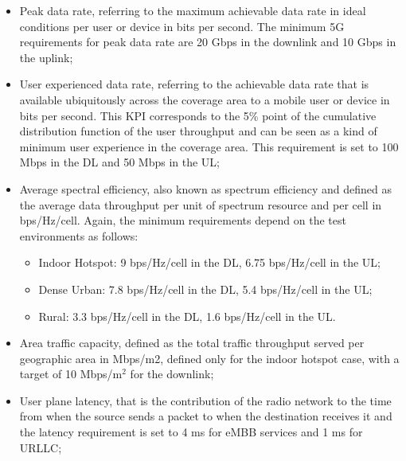 \documentclass[a4paper,12pt]{report} %
\begin{document}
\begin{itemize}
\item Peak data rate, referring to the maximum achievable data rate in ideal conditions per user or
device in bits per second. The minimum 5G requirements for peak data rate are 20 Gbps in the
downlink and 10 Gbps in the uplink;
\end{itemize}
\begin{itemize}
\item User experienced data rate, referring to the achievable data rate that is available ubiquitously
across the coverage area to a mobile user or device in bits per second. This KPI corresponds to the
5\% point of the cumulative distribution function of the user throughput and can be seen as
a kind of minimum user experience in the coverage area. This requirement is set to
100 Mbps in the DL and 50 Mbps in the UL;
\end{itemize}
\begin{itemize}
\item Average spectral efficiency, also known as spectrum efficiency and defined as the average data
throughput per unit of spectrum resource and per cell in bps/Hz/cell. Again, the minimum requirements depend on the test environments as follows:
\begin{itemize}
\item Indoor Hotspot: 9 bps/Hz/cell in the DL, 6.75 bps/Hz/cell in the UL;
\end{itemize}
\begin{itemize}
\item Dense Urban: 7.8 bps/Hz/cell in the DL, 5.4 bps/Hz/cell in the UL;
\end{itemize}
\begin{itemize}
\item Rural: 3.3 bps/Hz/cell in the DL, 1.6 bps/Hz/cell in the UL.
\end{itemize}
\end{itemize}
\begin{itemize}
\item Area traffic capacity, defined as the total traffic throughput served per geographic area in Mbps/m2, defined only for the indoor hotspot case, with a target of 10 Mbps/m$^2$ for
the downlink;
\end{itemize}
\begin{itemize}
\item User plane latency, that is the contribution of the radio network to the time from when the
source sends a packet to when the destination receives it and the latency
requirement is set to 4 ms for eMBB services and 1 ms for URLLC;
\end{itemize}
\end{document}
